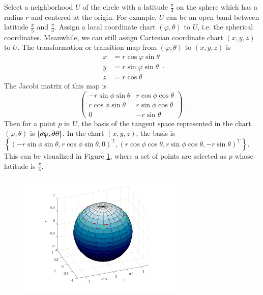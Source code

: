 \documentclass[11pt, a4paper]{book}
\begin{document}
\begin{Example}
  Select a neighborhood $U$ of the circle with a latitude $\frac{\pi}{4}$ on the sphere
  which has a radius $r$ and centered at the origin. For example, $U$ can be an open band
  between latitude $\frac{\pi}{5}$ and $\frac{\pi}{3}$. Assign a local coordinate chart
  $(\varphi, \theta)$ to $U$, i.e. the spherical coordinates. Meanwhile, we can still
  assign Cartesian coordinate chart $(x,y,z)$ to $U$. The transformation or transition map
  from $(\varphi,\theta)$ to $(x,y,z)$ is
  \begin{equation}
    \begin{aligned}
      x &= r \cos\varphi \sin\theta \\
      y &= r \sin\varphi \sin\theta \\
      z &= r \cos\theta
    \end{aligned}.
  \end{equation}
  The Jacobi matrix of this map is
  \begin{equation}
    \label{eq:spherical-coordinate-jacobi}
    \begin{pmatrix}
      -r\sin\phi \sin\theta & r\cos\phi \cos\theta \\
      r\cos\phi \sin\theta & r \sin\phi \cos\theta \\
      0 & -r\sin\theta
    \end{pmatrix}.
  \end{equation}
  Then for a point $p$ in $U$, the basis of the tangent space represented in the chart
  $(\varphi, \theta)$ is $\left\{ \boldsymbol{\partial}\varphi, \boldsymbol{\partial}\theta \right\}$. In
  the chart $(x,y,z)$, the basis is
  $\left\{ (-r\sin\phi \sin\theta, r\cos\phi \sin\theta, 0)^{\mathrm{T}}, (r\cos\phi
    \cos\theta, r\sin\phi \cos\theta, -r\sin\theta)^{\mathrm{T}} \right\}$. This can be
  visualized in Figure \ref{fig:basis-on-sphere}, where a set of points are selected as
  $p$ whose latitude is $\frac{\pi}{4}$.
  \begin{figure}[htbp]
    \centering
    \includegraphics[width=0.7\textwidth, height=\textheight, keepaspectratio]{figures/basis-on-sphere}
    \caption{}
    \label{fig:basis-on-sphere}
  \end{figure}
\end{Example}
\end{document}
